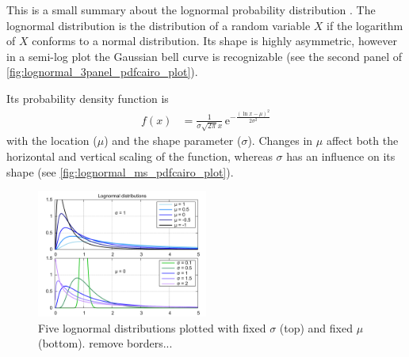 This is a small summary about the lognormal probability distribution \citep[p.~780]{Bronstein2000}. The lognormal distribution is the distribution of a random variable $X$ if the logarithm of $X$ conforms to a normal distribution. Its shape is highly asymmetric, however in a semi-log plot the Gaussian bell curve is recognizable (see the second panel of \autoref{fig:lognormal_3panel_pdfcairo_plot}).
\begin{figure}[htb]
\end{figure}
Its probability density function is
\begin{align}
	f(x) &= \frac{1}{\sigma \sqrt{2 \pi} x} \, \text{e}^{- \frac{(\ln x - \mu)^2}{2 \sigma^2}}
\end{align}
with the location ($\mu$) and the shape parameter ($\sigma$). Changes in $\mu$ affect both the horizontal and vertical scaling of the function, whereas $\sigma$ has an influence on its shape (see \autoref{fig:lognormal_ms_pdfcairo_plot}).\\
\begin{figure}[htb]
	\centering
	\includegraphics[width=0.5\textwidth]{images/gnuplots/lognormal_ms_pdfcairo_plot.pdf}
	\caption{Five lognormal distributions plotted with fixed $\sigma$ (top) and fixed $\mu$ (bottom). remove borders...}
	\label{fig:lognormal_ms_pdfcairo_plot}
\end{figure}

